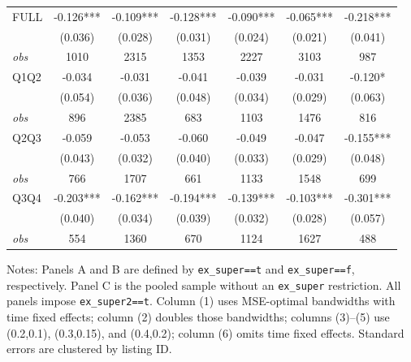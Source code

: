 \begin{table}[!htbp]
\begin{tabular}{lcccccc}
FULL & -0.126*** & -0.109*** & -0.128*** & -0.090*** & -0.065*** & -0.218*** \\
 & (0.036) & (0.028) & (0.031) & (0.024) & (0.021) & (0.041) \\
\textit{obs} & 1010 & 2315 & 1353 & 2227 & 3103 & 987 \\
Q1Q2 & -0.034 & -0.031 & -0.041 & -0.039 & -0.031 & -0.120* \\
 & (0.054) & (0.036) & (0.048) & (0.034) & (0.029) & (0.063) \\
\textit{obs} & 896 & 2385 & 683 & 1103 & 1476 & 816 \\
Q2Q3 & -0.059 & -0.053 & -0.060 & -0.049 & -0.047 & -0.155*** \\
 & (0.043) & (0.032) & (0.040) & (0.033) & (0.029) & (0.048) \\
\textit{obs} & 766 & 1707 & 661 & 1133 & 1548 & 699 \\
Q3Q4 & -0.203*** & -0.162*** & -0.194*** & -0.139*** & -0.103*** & -0.301*** \\
 & (0.040) & (0.034) & (0.039) & (0.032) & (0.028) & (0.057) \\
\textit{obs} & 554 & 1360 & 670 & 1124 & 1627 & 488 \\
\bottomrule
\end{tabular}
\begin{minipage}{0.98\textwidth}\footnotesize
Notes: Panels A and B are defined by \texttt{ex\_super==t} and \texttt{ex\_super==f}, respectively. Panel C is the pooled sample without an \texttt{ex\_super} restriction. All panels impose \texttt{ex\_super2==t}. Column (1) uses MSE-optimal bandwidths with time fixed effects; column (2) doubles those bandwidths; columns (3)--(5) use (0.2,0.1), (0.3,0.15), and (0.4,0.2); column (6) omits time fixed effects. Standard errors are clustered by listing ID.
\end{minipage}
\end{table}
